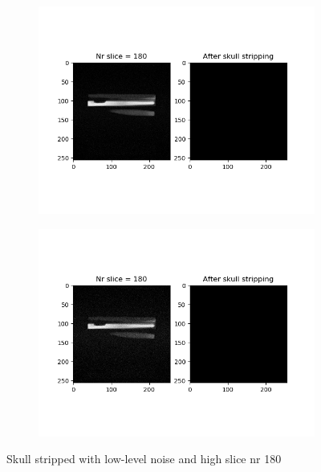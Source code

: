 \begin{figure}[H]
	\centering
	\begin{subfigure}[b]{0.35\linewidth}
		\includegraphics[scale=0.35]{figures/Module_08/M8_19.png}
	\end{subfigure}
		\begin{subfigure}[b]{0.35\linewidth}
		\includegraphics[scale=0.35]{figures/Module_08/M8_n19.png}
	\end{subfigure}
	\caption{Skull stripped with low-level noise and high slice nr 180}
	\label{fig:figures/m08_19}
\end{figure}